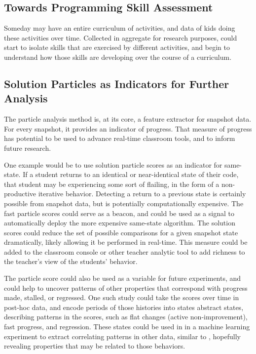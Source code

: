 \subsection{Towards Programming Skill Assessment}
Someday may have an entire curriculum of activities, and data of kids doing these activities over time. Collected in aggregate for research purposes, could start to isolate skills that are exercised by different activities, and begin to understand how those skills are developing over the course of a curriculum.

\subsection{Solution Particles as Indicators for Further Analysis}
The particle analysis method is, at its core, a feature extractor for snapshot data. For every snapshot, it provides an indicator of progress. That measure of progress has potential to be used to advance real-time classroom tools, and to inform future research. 

One example would be to use solution particle scores as an indicator for same-state. If a student returns to an identical or near-identical state of their code, that student may be experiencing some sort of flailing, in the form of a non-productive iterative behavior. Detecting a return to a previous state is certainly possible from snapshot data, but is potentially computationally expensive. The fast particle scores could serve as a beacon, and could be used as a signal to automatically deploy the more expensive same-state algorithm. The solution scores could reduce the set of possible comparisons for a given snapshot state dramatically, likely allowing it be performed in real-time. This measure could be added to the classroom console or other teacher analytic tool to add richness to the teacher's view of the students' behavior. 

The particle score could also be used as a variable for future experiments, and could help to uncover patterns of other properties that correspond with progress made, stalled, or regressed. One such study could take the scores over time in post-hoc data, and encode periods of those histories into states abstract states, describing patterns in the scores, such as flat changes (active non-improvement), fast progress, and regression. These states could be used in in a machine learning experiment to extract correlating patterns in other data, similar to \citet{tissenbaummodeling}, hopefully revealing properties that may be related to those behaviors.

